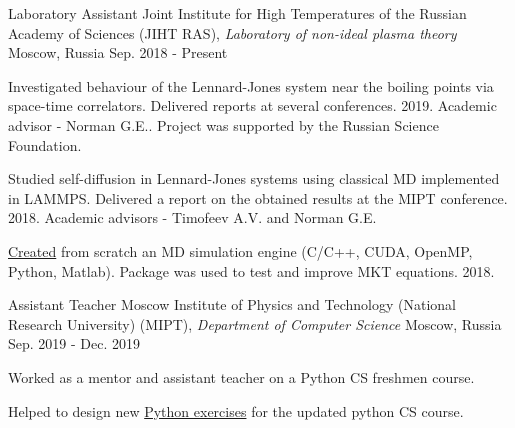

\begin{cventries}

  \cventry
    {Laboratory Assistant} %
    {Joint Institute for High Temperatures of the Russian Academy of Sciences (JIHT RAS), \textit{Laboratory of non-ideal plasma theory}} %
    {Moscow, Russia} %
    {Sep. 2018 - Present} %
    {
      \begin{cvitems} %
        \item {Investigated behaviour of the Lennard-Jones system near the boiling points via space-time correlators. Delivered reports at several conferences. 2019. Academic advisor - Norman G.E.. Project was supported by the Russian Science Foundation.}
      	\item {Studied self-diffusion in Lennard-Jones systems using classical MD implemented in LAMMPS. Delivered a report on the obtained results at the MIPT conference. 2018. Academic advisors - Timofeev A.V. and Norman G.E. }
      	\item {\href{https://github.com/PolyachenkoYA/molecules}{Created} from scratch an MD simulation engine (C/C++, CUDA, OpenMP, Python, Matlab). Package was used to test and improve MKT equations.  2018.}
      \end{cvitems}
    }

  \cventry
    {Assistant Teacher} %
    {Moscow Institute of Physics and Technology (National Research University) (MIPT), \newline \textit{Department of Computer Science}} %
    {Moscow, Russia} %
    {Sep. 2019 - Dec. 2019} %
    {
      \begin{cvitems} %
        \item {Worked as a mentor and assistant teacher on a Python CS freshmen course.}
        \item {Helped to design new \href{http://cs.mipt.ru/python}{Python exercises} for the updated python CS course.}
      \end{cvitems}
    }
    

\end{cventries}
